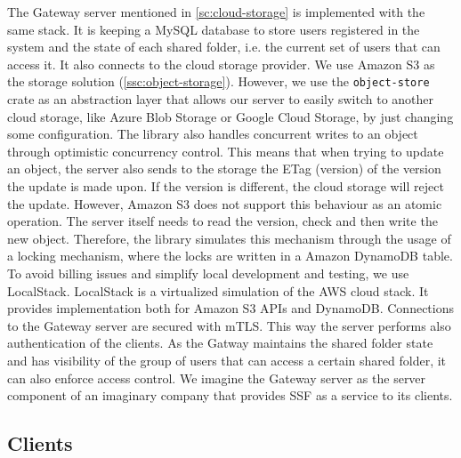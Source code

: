 The Gateway server mentioned in \cref{sc:cloud-storage}
is implemented with the same stack. It is keeping
a MySQL database to store users registered in the system and
the state of each shared folder, i.e. the current set of users
that can access it. 
It also connects to the cloud storage provider. 
We use Amazon S3 as the storage solution (\cref{ssc:object-storage}).
However, we use the \texttt{object-store} crate as an abstraction layer
that allows our server to easily switch to another cloud storage,
like Azure Blob Storage or Google Cloud Storage, by just changing
some configuration. The library also handles concurrent writes
to an object through optimistic concurrency control.
This means that when trying to update an object,
the server also sends to the storage the ETag (version)
of the version the update is made upon.
If the version is different, the cloud storage will reject the update.
However, Amazon S3 does not support this behaviour as an atomic operation. 
The server itself needs to read the version,
check and then write the new object.
Therefore, the library simulates this mechanism through the usage
of a locking mechanism, where the locks are written in a
Amazon DynamoDB table.
To avoid billing issues and simplify local development and testing,
we use LocalStack. LocalStack is a virtualized simulation
of the AWS cloud stack. It provides implementation both for Amazon S3
APIs and DynamoDB.
Connections to the Gateway server are secured with mTLS.
This way the server performs also authentication of the clients.
As the Gatway maintains the shared folder state and has visibility
of the group of users that can access a certain shared folder, 
it can also enforce access control.
We imagine the Gateway server as the server component of an
imaginary company that provides SSF as a service to its clients.


\subsection{Clients}\label{scc:clients}

